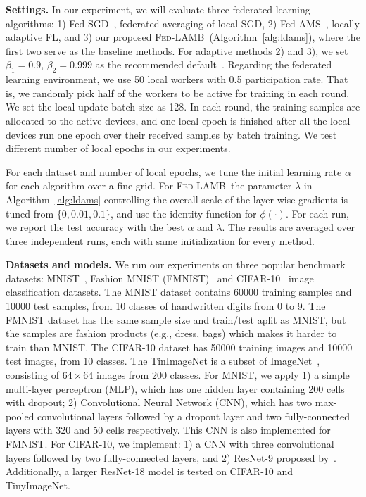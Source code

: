 \documentclass[11pt]{article}
\newcommand{\algo}{\textsc{Fed-LAMB}}
\begin{document}
\vspace{0.1in}
\noindent\textbf{Settings.} In our experiment, we will evaluate three federated learning algorithms: 1) Fed-SGD~\cite{mcmahan2017communication}, federated averaging of local SGD, 2) Fed-AMS~\cite{chen2020toward}, locally adaptive FL, and 3) our proposed \algo\ (Algorithm~\ref{alg:ldams}), where the first two serve as the baseline methods. For adaptive methods 2) and 3), we set $\beta_1=0.9$, $\beta_2=0.999$ as the recommended default~\citep{reddi2019convergence}. Regarding the federated learning environment, we use 50 local workers with 0.5 participation rate. That is, we randomly pick half of the workers to be active for training in each round. We set the local update batch size as 128. In each round, the training samples are allocated to the active devices, and one local epoch is finished after all the local devices run one epoch over their received samples by batch training. We test different number of local epochs in our experiments. 

For each dataset and number of local epochs, we tune the initial learning rate $\alpha$ for each algorithm over a fine grid. For \algo\, the parameter $\lambda$ in Algorithm~\ref{alg:ldams} controlling the overall scale of the layer-wise gradients is tuned from $\{0,0.01,0.1\}$, and use the identity function for $\phi(\cdot)$.
For each run, we report the test accuracy with the best $\alpha$ and $\lambda$. The results are averaged over three independent runs, each with same initialization for every method.

\vspace{0.1in}
\noindent\textbf{Datasets and models.} We run our experiments on three popular benchmark datasets: MNIST~\citep{lecun1998mnist}, Fashion MNIST (FMNIST)~\citep{fmnist} and CIFAR-10~\citep{krizhevsky2009learning} image classification datasets. The MNIST dataset contains 60000 training samples and 10000 test samples, from 10 classes of handwritten digits from 0 to 9. The FMNIST dataset has the same sample size and train/test aplit as MNIST, but the samples are fashion products (e.g., dress, bags) which makes it harder to train than MNIST. The CIFAR-10 dataset has 50000 training images and 10000 test images, from 10 classes. The TinImageNet is a subset of ImageNet~\citep{deng2009imagenet}, consisting of $64\times 64$ images from 200 classes. For MNIST, we apply 1) a simple multi-layer perceptron (MLP), which has one hidden layer containing 200 cells with dropout; 2) Convolutional Neural Network (CNN), which has two max-pooled convolutional layers followed by a dropout layer and two fully-connected layers with 320 and 50 cells respectively. This CNN is also implemented for FMNIST. For CIFAR-10, we implement: 1) a CNN with three convolutional layers followed by two fully-connected layers, and 2) ResNet-9 proposed by~\cite{Proc:He-resnet16}. 
Additionally, a larger ResNet-18 model is tested on CIFAR-10 and TinyImageNet. 
\end{document}
